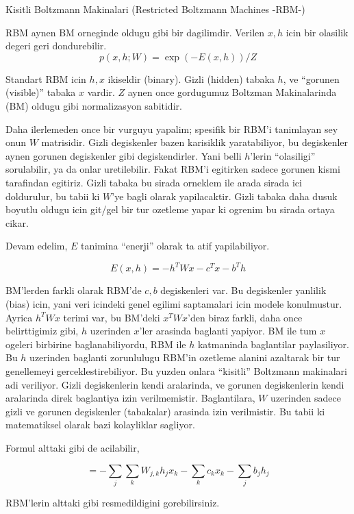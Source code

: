 \documentclass[12pt,fleqn]{article}\usepackage{../common}
\begin{document}
Kisitli Boltzmann Makinalari (Restricted Boltzmann Machines -RBM-)

RBM aynen BM orneginde oldugu gibi bir dagilimdir. Verilen $x,h$ icin bir
olasilik degeri geri dondurebilir. 
$$ p(x,h;W) = \exp (-E(x,h)) / Z $$

Standart RBM icin $h,x$ ikiseldir (binary). Gizli (hidden) tabaka $h$, ve
``gorunen (visible)'' tabaka $x$ vardir. $Z$ aynen once gordugumuz Boltzman
Makinalarinda (BM) oldugu gibi normalizasyon sabitidir.

Daha ilerlemeden once bir vurguyu yapalim; spesifik bir RBM'i tanimlayan
sey onun $W$ matrisidir. Gizli degiskenler bazen karisiklik yaratabiliyor,
bu degiskenler aynen gorunen degiskenler gibi degiskendirler. Yani belli
$h$'lerin ``olasiligi'' sorulabilir, ya da onlar uretilebilir. Fakat RBM'i
egitirken sadece gorunen kismi tarafindan egitiriz. Gizli tabaka bu sirada
orneklem ile arada sirada ici doldurulur, bu tabii ki $W$'ye bagli olarak
yapilacaktir. Gizli tabaka daha dusuk boyutlu oldugu icin git/gel bir tur
ozetleme yapar ki ogrenim bu sirada ortaya cikar. 

Devam edelim, $E$ tanimina ``enerji'' olarak ta atif yapilabiliyor.

$$ E(x,h) = -h^TWx - c^Tx - b^Th $$

BM'lerden farkli olarak RBM'de $c,b$ degiskenleri var. Bu degiskenler
yanlilik (bias) icin, yani veri icindeki genel egilimi saptamalari icin
modele konulmustur. Ayrica $h^TWx$ terimi var, bu BM'deki $x^TWx$'den biraz
farkli, daha once belirttigimiz gibi, $h$ uzerinden $x$'ler arasinda
baglanti yapiyor. BM ile tum $x$ ogeleri birbirine baglanabiliyordu, RBM
ile $h$ katmaninda baglantilar paylasiliyor. Bu $h$ uzerinden baglanti
zorunlulugu RBM'in ozetleme alanini azaltarak bir tur genellemeyi
gerceklestirebiliyor. Bu yuzden onlara ``kisitli'' Boltzmann makinalari adi
veriliyor. Gizli degiskenlerin kendi aralarinda, ve gorunen degiskenlerin
kendi aralarinda direk baglantiya izin verilmemistir. Baglantilara, $W$
uzerinden sadece gizli ve gorunen degiskenler (tabakalar) arasinda izin
verilmistir. Bu tabii ki matematiksel olarak bazi kolayliklar sagliyor.

Formul alttaki gibi de acilabilir,

$$ = - \sum_j \sum_k W_{j,k}h_jx_k - \sum_k c_kx_k - \sum_j b_jh_j  $$

RBM'lerin alttaki gibi resmedildigini gorebilirsiniz.
\end{document}
